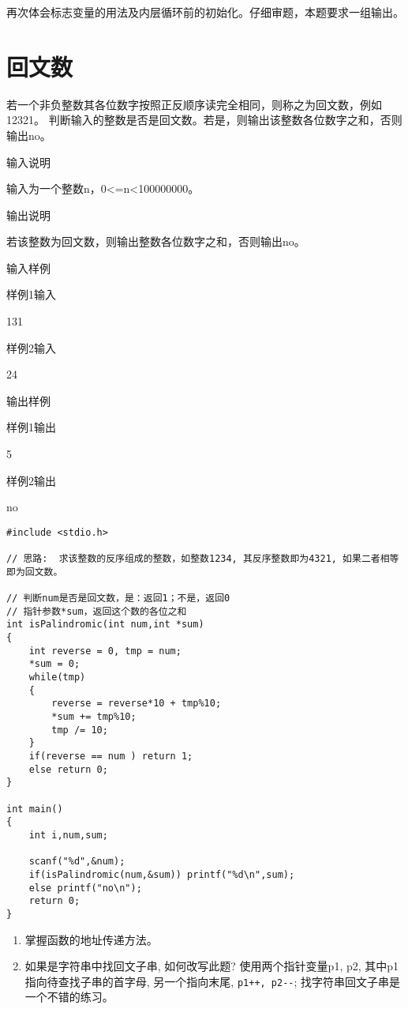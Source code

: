 \begin{note}[要点]
	再次体会标志变量的用法及内层循环前的初始化。仔细审题，本题要求一组输出。
\end{note}

\section{回文数}
若一个非负整数其各位数字按照正反顺序读完全相同，则称之为回文数，例如12321。
判断输入的整数是否是回文数。若是，则输出该整数各位数字之和，否则输出no。

输入说明	

输入为一个整数n，0<=n<100000000。

输出说明	

若该整数为回文数，则输出整数各位数字之和，否则输出no。

输入样例
	
样例1输入

131

样例2输入

24

输出样例

样例1输出
	
5

样例2输出

no

\begin{lstlisting}
#include <stdio.h>

// 思路:  求该整数的反序组成的整数，如整数1234, 其反序整数即为4321, 如果二者相等即为回文数。 

// 判断num是否是回文数，是：返回1；不是，返回0
// 指针参数*sum，返回这个数的各位之和  
int isPalindromic(int num,int *sum)
{
	int reverse = 0, tmp = num;
	*sum = 0; 
	while(tmp)
	{
		reverse = reverse*10 + tmp%10;
		*sum += tmp%10;
		tmp /= 10;
	}
	if(reverse == num ) return 1;
	else return 0;	
}

int main()
{
	int i,num,sum;
	
	scanf("%d",&num); 
	if(isPalindromic(num,&sum)) printf("%d\n",sum);
	else printf("no\n");
	return 0;
} 
\end{lstlisting}

\begin{note}[要点]
	\begin{enumerate}
		\item 掌握函数的地址传递方法。
		\item 如果是字符串中找回文子串, 如何改写此题? 使用两个指针变量p1, p2, 其中p1指向待查找子串的首字母, 另一个指向末尾, \lstinline|p1++, p2--|; 找字符串回文子串是一个不错的练习。
	\end{enumerate}
\end{note}

